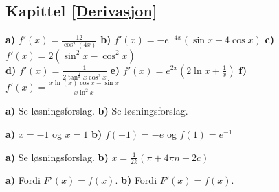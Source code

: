 %



\subsection*{Kapittel \ref{Derivasjon}}
\footnotesize
{} \textbf{a)} $f'(x)= \frac{12}{\cos^2(4x)} $ \textbf{b)} $f'(x)= -e^{-4 x} (\sin x + 4 \cos x) $ \textbf{c)} $ f'(x)=2(\sin^2 x -\cos^2 x) $ \\\textbf{d)} $f'(x)= \frac{1}{2\tan^\frac{1}{2}x\cos^2 x} $ \textbf{e)} $f'(x)= e^{2x}\left(2\ln x +\frac{1}{x}\right) $ \textbf{f)} $ f'(x)=\frac{x \ln(x) \cos x - \sin x}{x \ln^2 x} $

\textbf{a)} Se løsningsforslag.
\textbf{b)} Se løsningsforslag.

 \textbf{a)} $ x=-1 $ og $ x=1 $ \textbf{b)} $ f(-1)=-e $ og $ f(1)=e^{-1} $

 \textbf{a)} Se løsningsforslag. \textbf{b)} $ x = \frac{1}{2k}(\pi+4\pi n + 2c) $

 \textbf{a)} Fordi $ F'(x)=f(x) $. \textbf{b)} Fordi  $ F'(x)=f(x) $. 
